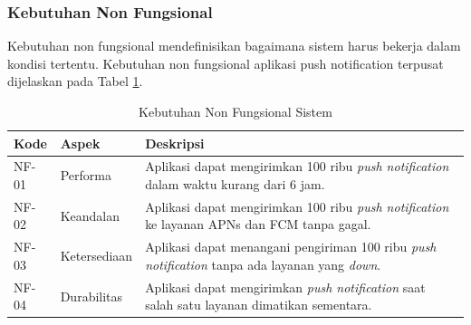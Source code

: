 \subsubsection{Kebutuhan Non Fungsional}
\par Kebutuhan non fungsional mendefinisikan bagaimana sistem harus bekerja dalam kondisi tertentu. Kebutuhan non fungsional aplikasi push notification terpusat dijelaskan pada Tabel \ref{t:non_fungsional}.
\begin{longtable}{|p{1.2cm}|p{2cm}|p{5.5cm}|}
	\caption{Kebutuhan Non Fungsional Sistem} \label{t:non_fungsional} \\ \hline
    \rowcolor{lightgray} Kode & Aspek & Deskripsi \\ \hline
    \endhead
    NF-01 & Performa & Aplikasi dapat mengirimkan 100 ribu \textit{push notification} dalam waktu kurang dari 6 jam. \\ \hline
    NF-02 & Keandalan & Aplikasi dapat mengirimkan 100 ribu \textit{push notification} ke layanan APNs dan FCM tanpa gagal. \\ \hline
    NF-03 & Ketersediaan & Aplikasi dapat menangani pengiriman 100 ribu \textit{push notification} tanpa ada layanan yang \textit{down}. \\ \hline
    NF-04 & Durabilitas & Aplikasi dapat mengirimkan \textit{push notification} saat salah satu layanan dimatikan sementara. \\ \hline
\end{longtable}


